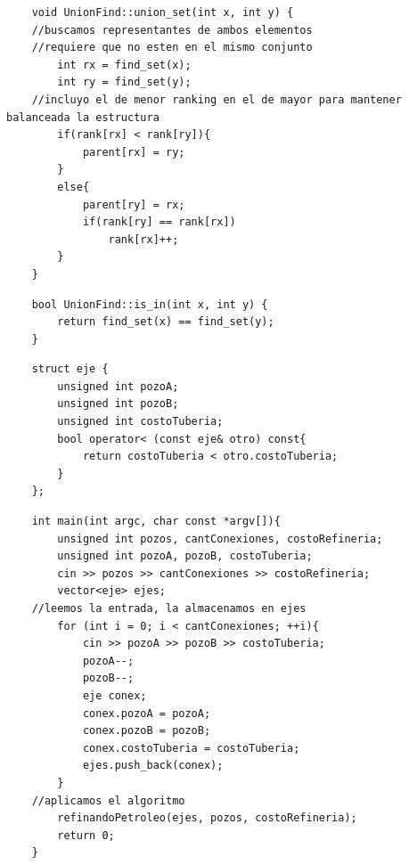 	\begin{codesnippet}
	\begin{verbatim}
    void UnionFind::union_set(int x, int y) {
    //buscamos representantes de ambos elementos
    //requiere que no esten en el mismo conjunto
        int rx = find_set(x);
        int ry = find_set(y);
    //incluyo el de menor ranking en el de mayor para mantener balanceada la estructura
        if(rank[rx] < rank[ry]){
            parent[rx] = ry;
        }
        else{
            parent[ry] = rx;
            if(rank[ry] == rank[rx])
                rank[rx]++;
        }
    }
	\end{verbatim}
	\end{codesnippet}

	\begin{codesnippet}
	\begin{verbatim}
    bool UnionFind::is_in(int x, int y) {
        return find_set(x) == find_set(y);
    }
	\end{verbatim}
	\end{codesnippet}

	\begin{codesnippet}
	\begin{verbatim}
    struct eje {
        unsigned int pozoA;
        unsigned int pozoB;
        unsigned int costoTuberia;
        bool operator< (const eje& otro) const{
            return costoTuberia < otro.costoTuberia;
        }
    };
	\end{verbatim}
	\end{codesnippet}

	\begin{codesnippet}
	\begin{verbatim}
    int main(int argc, char const *argv[]){
        unsigned int pozos, cantConexiones, costoRefineria;
        unsigned int pozoA, pozoB, costoTuberia;
        cin >> pozos >> cantConexiones >> costoRefineria;
        vector<eje> ejes;
    //leemos la entrada, la almacenamos en ejes
        for (int i = 0; i < cantConexiones; ++i){
            cin >> pozoA >> pozoB >> costoTuberia;
            pozoA--;
            pozoB--;
            eje conex;
            conex.pozoA = pozoA;
            conex.pozoB = pozoB;
            conex.costoTuberia = costoTuberia;
            ejes.push_back(conex);
        }
    //aplicamos el algoritmo
        refinandoPetroleo(ejes, pozos, costoRefineria);
        return 0;
    }
	\end{verbatim}
	\end{codesnippet}

